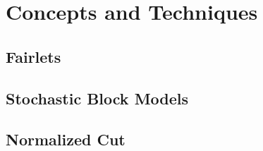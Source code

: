 \section{Concepts and Techniques}

\subsection{Fairlets}
\textcite[]{Chierichetti2018}

\subsection{Stochastic Block Models}
\textcite[]{Lei2013}

\subsection{Normalized Cut}
\textcite[]{Eriksson2011}
\textcite[]{Xu2010}
\textcite[]{Yu2004}
